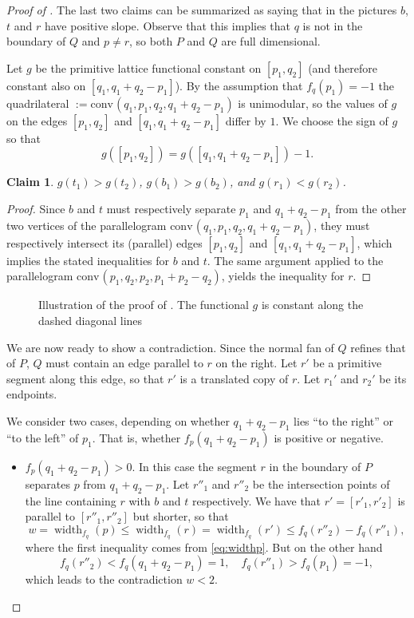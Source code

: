 \documentclass{amsart}
\theoremstyle{plain}
\newtheorem{claim}[theorem]{Claim}
\theoremstyle{definition}
\newcommand{\width}{\operatorname{width}}
\newcommand{\conv}{\ensuremath{\mathrm{conv}}\hspace{1pt}}
\begin{document}
\begin{proof}[Proof of ]
The last two claims can be summarized as saying that in the pictures $b$, $t$ and $r$ have positive slope. Observe that this implies that $q$ is not in the boundary of $Q$ and $p \neq r$, so both $P$ and $Q$ are full dimensional.


Let $g$ be the primitive lattice functional constant on $[p_1, q_2]$ (and therefore constant also on $[q_1, q_1+q_2-p_1]$). By the assumption that $f_q(p_1)=-1$ the quadrilateral $:=\conv(q_1, p_1, q_2, q_1+q_2-p_1)$
 is unimodular, so  the values of $g$ on the edges $[p_1, q_2]$ and $[q_1, q_1+q_2-p_1]$ differ by $1$. We choose the sign of $g$ so that 
\[
g([p_1, q_2])= g( [q_1, q_1+q_2-p_1]) -1. 
\]

\begin{claim}
\label{claim:g}
$g(t_1) > g(t_2)$, $g(b_1) > g(b_2)$, and $g(r_1) < g(r_2)$.
\end{claim}

\begin{proof}
Since $b$ and $t$ must respectively separate $p_1$ and $q_1+q_2-p_1$ from the other two vertices of the parallelogram $\conv(q_1, p_1, q_2, q_1+q_2-p_1)$, they must respectively intersect its (parallel) edges $[p_1, q_2]$ and $[q_1, q_1+q_2-p_1]$, which implies the stated inequalities for $b$ and $t$.
The same argument  applied to the parallelogram  $\conv(p_1, q_2, p_2, p_1+p_2-q_2)$, yields the inequality for $r$.
\end{proof}

\begin{figure}[htb]
\scalebox{.75}{}
\caption{Illustration of the proof of . The functional $g$ is constant along the dashed diagonal lines}
\label{fig:claim4}
\end{figure}

We are now ready to show a contradiction. Since the normal fan of $Q$ refines that of $P$, $Q$ must contain an edge parallel to $r$ on the right. Let $r'$ be a primitive segment along this edge, so that $r'$ is a translated copy of $r$.
 Let $r_1'$ and $r_2'$ be its endpoints. 

We consider two cases, depending on whether $q_1+q_2-p_1$ lies ``to the right'' or ``to the left'' of $p_1$. That is, whether $f_p(q_1+q_2-p_1)$ is positive or negative. %
 
\begin{itemize}
\item \underline{$f_p(q_1+q_2-p_1)> 0$}. In this case the segment $r$ in the boundary of $P$ separates $p$ from  $q_1+q_2-p_1$.
Let $r''_1$ and $r''_2$ be the intersection points of the line containing $r$ with $b$ and $t$ respectively. We have that
$r'=[r'_1,r'_2]$ is parallel to $[r''_1,r''_2]$ but shorter, so that
\[
w= \width_{f_q}(p) \le \width_{f_q}(r) = \width_{f_q}(r') \le  f_q(r''_2) -f_q(r''_1), 
\]
where the first inequality comes from \eqref{eq:widthp}.
But on the other hand
\[
f_q(r''_2) < f_q(q_1+q_2-p_1) = 1, \quad f_q(r''_1) > f_q(p_1) =-1,
\]
which leads to the contradiction $w<2$.



\end{itemize}
\end{proof}
\end{document}
